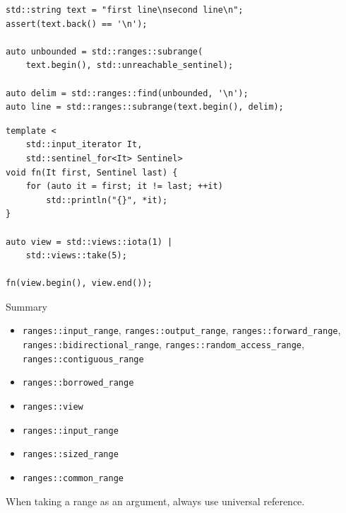 \documentclass[aspectratio=169]{beamer}
\begin{document}
\begin{frame}[fragile,c]
\large
\begin{center}
\begin{verbatim}
std::string text = "first line\nsecond line\n";
assert(text.back() == '\n');

auto unbounded = std::ranges::subrange(
    text.begin(), std::unreachable_sentinel);

auto delim = std::ranges::find(unbounded, '\n');
auto line = std::ranges::subrange(text.begin(), delim);
\end{verbatim}
\end{center}
\let\thefootnote\relax{}
\end{frame}

\begin{frame}[fragile,c]
\large
\begin{center}
\begin{verbatim}
template <
    std::input_iterator It,
    std::sentinel_for<It> Sentinel>
void fn(It first, Sentinel last) {
    for (auto it = first; it != last; ++it)
        std::println("{}", *it);
}

auto view = std::views::iota(1) |
    std::views::take(5);
   
fn(view.begin(), view.end());
\end{verbatim}
\end{center}
\let\thefootnote\relax{}
\end{frame}

\begin{frame}{Summary}
    \begin{itemize}
        \item \texttt{ranges::input_range}, \texttt{ranges::output_range}, \texttt{ranges::forward_range}, \texttt{ranges::bidirectional_range}, \texttt{ranges::random_access_range}, \texttt{ranges::contiguous_range}
        \pause \item \texttt{ranges::borrowed_range}
        \pause \item \texttt{ranges::view}
        \pause \item \texttt{ranges::input_range}
        \pause \item \texttt{ranges::sized_range}
        \pause \item \texttt{ranges::common_range}
    \end{itemize}\vspace{1em}
\pause
\Large
\begin{center}
    When taking a range as an argument, always use universal reference.
\end{center}
\end{frame}
\end{document}
